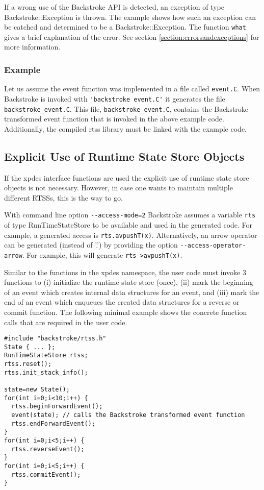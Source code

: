 \documentclass[english,12pt, titlepage]{article}      %
\begin{document}
If a wrong use of the Backstroke API is detected, an exception of type
Backstroke::Exception is thrown. The example shows how such an
exception can be catched and determined to be a
Backstroke::Exception. The function \verb+what+ gives a brief
explanation of the error. See section \ref{section:errorsandexceptions} for
more information.

\subsubsection{Example}

Let us assume the event function was implemented in a file called
\verb+event.C+. When Backstroke is invoked with
\verb+'backstroke event.C'+ it generates the file
\verb+backstroke_event.C+. This file, \verb+backstroke_event.C+,
contains the Backstroke transformed event function that is invoked in
the above example code. Additionally, the compiled rtss library
must be linked with the example code.

\subsection{Explicit Use of Runtime State Store Objects}

If the xpdes interface functions are used the explicit use of runtime
state store objects is not necessary. However, in case one wants to
maintain multiple different RTSSs, this is the way to go.

With command line option \verb+--access-mode=2+ Backstroke assumes a
variable \verb+rts+ of type RunTimeStateStore to be available and
used in the generated code. For example, a generated access is
\verb+rts.avpushT(x)+. Alternatively, an arrow operator can be
generated (instead of '.') by providing the option
\verb+--access-operator-arrow+. For example, this will generate
\verb+rts->avpushT(x)+.

Similar to the functions in the xpdes namespace, the user code must
invoke 3 functions to (i) initialize the runtime state store (once),
(ii) mark the beginning of an event which creates internal data
structures for an event, and (iii) mark the end of an event which
enqueues the created data structures for a reverse or commit
function. The following minimal example shows the concrete function
calls that are required in the user code.

{
\footnotesize
\begin{verbatim}
#include "backstroke/rtss.h"
State { ... };
RunTimeStateStore rtss;
rtss.reset();
rtss.init_stack_info();

state=new State();
for(int i=0;i<10;i++) {
  rtss.beginForwardEvent();
  event(state); // calls the Backstroke transformed event function
  rtss.endForwardEvent();
}
for(int i=0;i<5;i++) {
  rtss.reverseEvent();
}
for(int i=0;i<5;i++) {
  rtss.commitEvent();
}
\end{verbatim}
}
\end{document}
